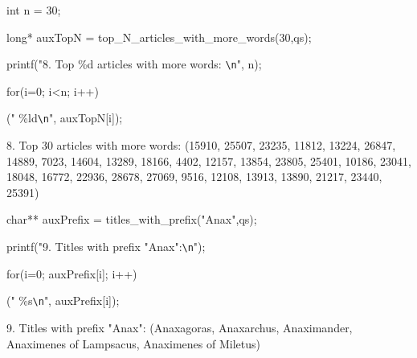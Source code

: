 \documentclass[a4paper,12pt]{report}
\newcommand\tab[1][1cm]{\hspace*{#1}}
\begin{document}
\begin{tcolorbox}[width=\textwidth,colback={darkgray},title={\sf Excerto 4.8: Top N Articles With More Words.},outer arc=2mm,colupper=white]{\footnotesize\tt		
				    
		{\color{newpink}int} n {\color{newpink}=} {\color{deadorange}30};
		
		{\color{newpink}long*} auxTopN = {\color{lightblue}top\_N\_articles\_with\_more\_words}({\color{deadorange}30},qs);
				    
		{\color{lightblue}printf}({\color{deadgreen}"8. Top {\color{deadorange}\%d} articles with more words:} {\color{lightblue}\texttt{\textbackslash n}}\color{deadgreen}"\color{white}, n);
				    
		{\color{newpink}for}(i{\color{newpink}=}{\color{deadorange}0}; i{\color{newpink}<}{\color{deadorange}n}; i{\color{newpink}++})
				    
		\tab {\color{lightblue}printf}(\color{deadgreen}"\color{white}   {\color{deadorange}\%ld}{\color{lightblue}\texttt{\textbackslash n}}\color{deadgreen}"\color{white}, auxTopN[i]);
		    
		8. Top 30 articles with more words: (15910, 25507, 23235, 11812, 13224, 26847, 14889, 7023, 14604, 13289, 18166, 4402, 12157, 13854, 23805, 25401, 10186, 23041, 18048, 16772, 22936, 28678, 27069, 9516, 12108, 13913, 13890, 21217, 23440, 25391)
		
	}
\end{tcolorbox} 



\begin{tcolorbox}[width=\textwidth,colback={darkgray},title={\sf Excerto 4.9: Titles With Prefix.},outer arc=2mm,colupper=white]{\footnotesize\tt
		
		{\color{newpink}char**} auxPrefix = {\color{lightblue}titles\_with\_prefix}(\color{deadgreen}"Anax"\color{white},qs);
		
		{\color{lightblue}printf}({\color{deadgreen}"9. Titles with prefix "Anax":}{\color{lightblue}\texttt{\textbackslash n}}\color{deadgreen}"\color{white});
		
		{\color{newpink}for}(i{\color{newpink}=}{\color{deadorange}0}; auxPrefix[i]; i{\color{newpink}++})
		
		\tab {\color{lightblue}printf}(\color{deadgreen}"\color{white}   {\color{deadorange}\%s}{\color{lightblue}\texttt{\textbackslash n}}\color{deadgreen}"\color{white}, auxPrefix[i]);
		
		9. Titles with prefix "Anax": (Anaxagoras, Anaxarchus, Anaximander, Anaximenes of Lampsacus, Anaximenes of Miletus)

	}
\end{tcolorbox} 
\end{document}
